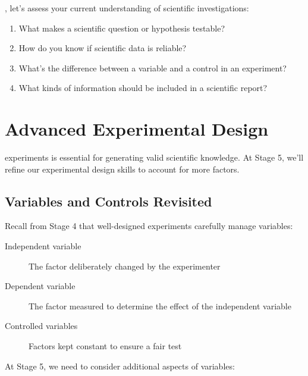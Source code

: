 \documentclass[justified,notoc]{tufte-book}
\newenvironment{keyconcept}[1]{%
    \begin{tcolorbox}[colback=primary!5,colframe=primary,title=\textbf{Key Concept: #1}]
}{%
    \end{tcolorbox}
}
\newenvironment{stopandthink}{%
    \begin{tcolorbox}[colback=highlight!30,colframe=highlight!50,title=\textbf{Stop and Think}]
}{%
    \end{tcolorbox}
}
\begin{document}
, let's assess your current understanding of scientific investigations:

\begin{stopandthink}
\begin{enumerate}
    \item What makes a scientific question or hypothesis testable?
    \item How do you know if scientific data is reliable?
    \item What's the difference between a variable and a control in an experiment?
    \item What kinds of information should be included in a scientific report?
\end{enumerate}
\end{stopandthink}

\section{Advanced Experimental Design}

 experiments is essential for generating valid scientific knowledge. At Stage 5, we'll refine our experimental design skills to account for more factors.

\subsection{Variables and Controls Revisited}

Recall from Stage 4 that well-designed experiments carefully manage variables:

\begin{keyconcept}{Key Variables in Experiments}
\begin{description}
    \item[Independent variable] The factor deliberately changed by the experimenter
    \item[Dependent variable] The factor measured to determine the effect of the independent variable
    \item[Controlled variables] Factors kept constant to ensure a fair test
\end{description}
\end{keyconcept}

At Stage 5, we need to consider additional aspects of variables:
\end{document}

